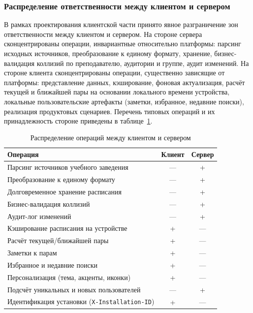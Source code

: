 \subsubsection{Распределение ответственности между клиентом и сервером}
\label{subsubsec:client-server-responsibilities}

В рамках проектирования клиентской части принято явное разграничение зон ответственности между клиентом и сервером. На стороне сервера сконцентрированы операции, инвариантные относительно платформы: парсинг исходных источников, преобразование к единому формату, хранение, бизнес-валидация коллизий по преподавателю, аудитории и группе, аудит изменений. На стороне клиента сконцентрированы операции, существенно зависящие от платформы: представление данных, кэширование, фоновая актуализация, расчёт текущей и ближайшей пары на основании локального времени устройства, локальные пользовательские артефакты (заметки, избранное, недавние поиски), реализация продуктовых сценариев. Перечень типовых операций и их принадлежность стороне приведены в таблице~\ref{tab:responsibility-split}.

\begin{table}[h]
  \caption{Распределение операций между клиентом и сервером}
  \label{tab:responsibility-split}
  \centering
  \small
  \begin{tabular}{p{} c c}
    \toprule
    Операция & Клиент & Сервер \\
    \midrule
    Парсинг источников учебного заведения       & --- & + \\
    Преобразование к единому формату            & --- & + \\
    Долговременное хранение расписания          & --- & + \\
    Бизнес-валидация коллизий                   & --- & + \\
    Аудит-лог изменений                         & --- & + \\
    Кэширование расписания на устройстве        & + & --- \\
    Расчёт текущей/ближайшей пары               & + & --- \\
    Заметки к парам                             & + & --- \\
    Избранное и недавние поиски                 & + & --- \\
    Персонализация (тема, акценты, иконки)      & + & --- \\
    Подсчёт уникальных и новых пользователей    & --- & + \\
    Идентификация установки (\texttt{X-Installation-ID}) & + & --- \\
    \bottomrule
  \end{tabular}
\end{table}

